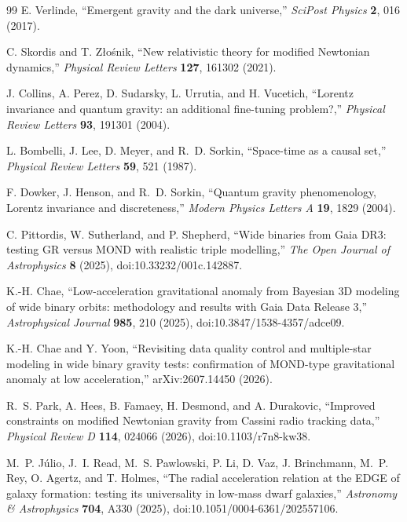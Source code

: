 \documentclass[11pt]{article}
\begin{document}
\begin{thebibliography}{99}
E. Verlinde,
``Emergent gravity and the dark universe,''
\emph{SciPost Physics} \textbf{2}, 016 (2017).

C. Skordis and T. Z\l{}o\'snik,
``New relativistic theory for modified Newtonian dynamics,''
\emph{Physical Review Letters} \textbf{127}, 161302 (2021).

J. Collins, A. Perez, D. Sudarsky, L. Urrutia, and H. Vucetich,
``Lorentz invariance and quantum gravity: an additional fine-tuning problem?,''
\emph{Physical Review Letters} \textbf{93}, 191301 (2004).

L. Bombelli, J. Lee, D. Meyer, and R.~D. Sorkin,
``Space-time as a causal set,''
\emph{Physical Review Letters} \textbf{59}, 521 (1987).

F. Dowker, J. Henson, and R.~D. Sorkin,
``Quantum gravity phenomenology, Lorentz invariance and discreteness,''
\emph{Modern Physics Letters A} \textbf{19}, 1829 (2004).

C. Pittordis, W. Sutherland, and P. Shepherd,
``Wide binaries from Gaia DR3: testing GR versus MOND with realistic triple modelling,''
\emph{The Open Journal of Astrophysics} \textbf{8} (2025),
doi:10.33232/001c.142887.

K.-H. Chae,
``Low-acceleration gravitational anomaly from Bayesian 3D modeling of wide binary orbits: methodology and results with Gaia Data Release 3,''
\emph{Astrophysical Journal} \textbf{985}, 210 (2025),
doi:10.3847/1538-4357/adce09.

K.-H. Chae and Y. Yoon,
``Revisiting data quality control and multiple-star modeling in wide binary gravity tests: confirmation of MOND-type gravitational anomaly at low acceleration,''
arXiv:2607.14450 (2026).

R.~S. Park, A. Hees, B. Famaey, H. Desmond, and A. Durakovic,
``Improved constraints on modified Newtonian gravity from Cassini radio tracking data,''
\emph{Physical Review D} \textbf{114}, 024066 (2026),
doi:10.1103/r7n8-kw38.

M.~P. J\'ulio, J.~I. Read, M.~S. Pawlowski, P. Li, D. Vaz, J. Brinchmann, M.~P. Rey, O. Agertz, and T. Holmes,
``The radial acceleration relation at the EDGE of galaxy formation: testing its universality in low-mass dwarf galaxies,''
\emph{Astronomy \& Astrophysics} \textbf{704}, A330 (2025),
doi:10.1051/0004-6361/202557106.


\end{thebibliography}
\end{document}

